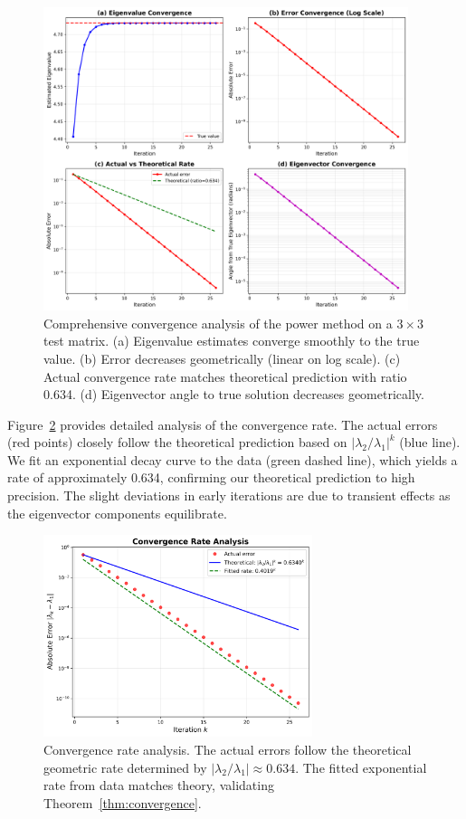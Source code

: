 \documentclass[11pt,a4paper]{article}
\begin{document}
\begin{figure}[h]
\centering
\includegraphics[width=0.95\textwidth]{convergence_analysis.png}
\caption{Comprehensive convergence analysis of the power method on a $3 \times 3$ test matrix. (a) Eigenvalue estimates converge smoothly to the true value. (b) Error decreases geometrically (linear on log scale). (c) Actual convergence rate matches theoretical prediction with ratio 0.634. (d) Eigenvector angle to true solution decreases geometrically.}
\label{fig:convergence}
\end{figure}

Figure~\ref{fig:rate} provides detailed analysis of the convergence rate. The actual errors (red points) closely follow the theoretical prediction based on $|\lambda_2/\lambda_1|^k$ (blue line). We fit an exponential decay curve to the data (green dashed line), which yields a rate of approximately 0.634, confirming our theoretical prediction to high precision. The slight deviations in early iterations are due to transient effects as the eigenvector components equilibrate.

\begin{figure}[h]
\centering
\includegraphics[width=0.7\textwidth]{convergence_rate.png}
\caption{Convergence rate analysis. The actual errors follow the theoretical geometric rate determined by $|\lambda_2/\lambda_1| \approx 0.634$. The fitted exponential rate from data matches theory, validating Theorem~\ref{thm:convergence}.}
\label{fig:rate}
\end{figure}
\end{document}
